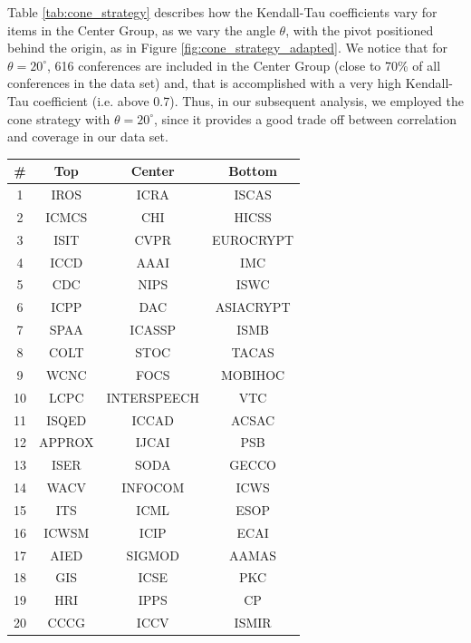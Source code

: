 \documentclass[man]{apa6}
\begin{document}
Table \ref{tab:cone_strategy} describes how the Kendall-Tau coefficients vary for items in the Center Group, as we vary the angle $ \theta $, with the pivot positioned behind the origin, as in Figure \ref{fig:cone_strategy_adapted}. We notice that for $ \theta = 20^{\circ} $, 616 conferences are included in the Center
Group (close to 70\% of all conferences in the data set) and, that is accomplished with a very high Kendall-Tau 
coefficient (i.e. above 0.7). Thus, in our subsequent 
analysis, we employed the cone strategy with $ \theta = 20^{\circ} $, since it provides a good trade off between correlation and coverage in our data set.

\begin{table}[h!]
  \small
  \centering
  \begin{tabular}{c c c c} 
  \toprule
  \# & Top & Center & Bottom \\ 
  \midrule
  1  & IROS      & ICRA        & ISCAS     \\
  2  & ICMCS     & CHI         & HICSS     \\
  3  & ISIT      & CVPR        & EUROCRYPT \\
  4  & ICCD      & AAAI        & IMC       \\
  5  & CDC       & NIPS        & ISWC      \\
  6  & ICPP      & DAC         & ASIACRYPT \\
  7  & SPAA      & ICASSP      & ISMB      \\
  8  & COLT      & STOC        & TACAS     \\
  9  & WCNC      & FOCS        & MOBIHOC   \\
  10 & LCPC      & INTERSPEECH & VTC       \\
  11 & ISQED     & ICCAD       & ACSAC     \\
  12 & APPROX    & IJCAI       & PSB       \\
  13 & ISER      & SODA        & GECCO     \\
  14 & WACV      & INFOCOM     & ICWS      \\
  15 & ITS       & ICML        & ESOP      \\
  16 & ICWSM     & ICIP        & ECAI      \\
  17 & AIED      & SIGMOD      & AAMAS     \\
  18 & GIS       & ICSE        & PKC       \\
  19 & HRI       & IPPS        & CP        \\
  20 & CCCG      & ICCV        & ISMIR     \\

\end{tabular}
\end{table}
\end{document}
